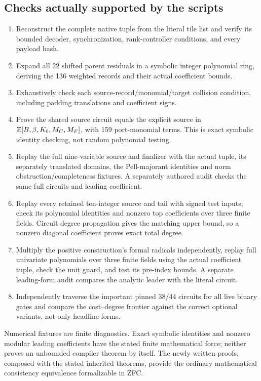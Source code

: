 \subsection{Checks actually supported by the scripts}
\begin{enumerate}
\item Reconstruct the complete native tuple from the literal tile list and
verify its bounded decoder, synchronization, rank-controller conditions,
and every payload hash.
\item Expand all 22 shifted parent residuals in a symbolic integer polynomial
ring, deriving the 136 weighted records and their actual coefficient bounds.
\item Exhaustively check each source-record/monomial/target collision
condition, including padding translations and coefficient signs.
\item Prove the shared source circuit equals the explicit source in
$\mathbb Z[B,\beta,K_0,M_C,M_F]$, with 159 port-monomial terms.
This is exact symbolic identity checking, not random polynomial testing.
\item Replay the full nine-variable source and finalizer with the actual
tuple, its separately translated domains, the Pell-majorant identities and
norm obstruction/completeness fixtures. A separately authored audit checks
the same full circuits and leading coefficient.
\item Replay every retained ten-integer source and tail with signed test
inputs; check its polynomial identities and nonzero top coefficients over
three finite fields. Circuit degree propagation gives the matching upper
bound, so a nonzero diagonal coefficient proves exact total degree.
\item Multiply the positive construction's formal radicals independently,
replay full univariate polynomials over three finite fields using the actual
coefficient tuple, check the unit guard, and test its pre-index bounds.
A separate leading-form audit compares the analytic leader with the literal
circuit.
\item Independently traverse the important pinned 38/44 circuits for all
live binary gates and compare the cost--degree frontier against the correct
optional variants, not only headline forms.
\end{enumerate}
Numerical fixtures are finite diagnostics. Exact symbolic identities and
nonzero modular leading coefficients have the stated finite mathematical
force; neither proves an unbounded compiler theorem by itself. The newly
written proofs, composed with the stated inherited theorems, provide the
ordinary mathematical consistency equivalence formalizable in ZFC.

